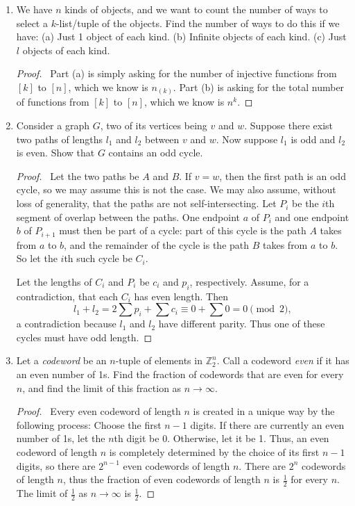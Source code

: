 \documentclass[12pt]{article}
\begin{document}
\begin{enumerate}[leftmargin=0cm,itemindent=.5cm,labelwidth=\itemindent,labelsep=0cm,align=left]
\item We have $n$ kinds of objects, and we want to count the number of ways to select a $k$-list/tuple of the objects.  Find the number of ways to do this if we have:
(a) Just 1 object of each kind.
(b) Infinite objects of each kind.
(c) Just $l$ objects of each kind.

\begin{proof}
\ Part (a) is simply asking for the number of injective functions from $[k]$ to $[n]$, which we know is $n_{(k)}$.  Part (b) is asking for the total number of functions from $[k]$ to $[n]$, which we know is $n^k$.
\end{proof}

\item Consider a graph $G$, two of its vertices being $v$ and $w$.  Suppose there exist two paths of lengths $l_1$ and $l_2$ between $v$ and $w$.  Now suppose $l_1$ is odd and $l_2$ is even.  Show that $G$ contains an odd cycle.

\begin{proof}
\ Let the two paths be $A$ and $B$.  If $v = w$, then the first path is an odd cycle, so we may assume this is not the case.  We may also assume, without loss of generality, that the paths are not self-intersecting.  Let $P_i$ be the $i$th segment of overlap between the paths.  One endpoint $a$ of $P_i$ and one endpoint $b$ of $P_{i+1}$ must then be part of a cycle: part of this cycle is the path $A$ takes from $a$ to $b$, and the remainder of the cycle is the path $B$ takes from $a$ to $b$.  So let the $i$th such cycle be $C_i$.

Let the lengths of $C_i$ and $P_i$ be $c_i$ and $p_i$, respectively.  Assume, for a contradiction, that each $C_i$ has even length.  Then
$$
l_1 + l_2 = 2\sum p_i + \sum c_i \equiv 0 + \sum 0 = 0 \pmod{2},
$$
a contradiction because $l_1$ and $l_2$ have different parity.  Thus one of these cycles must have odd length.
\end{proof}

\item Let a \emph{codeword} be an $n$-tuple of elements in $\mathbb{Z}_2^n$.  Call a codeword \emph{even} if it has an even number of 1s.  Find the fraction of codewords that are even for every $n$, and find the limit of this fraction as $n \rightarrow \infty$.

\begin{proof}
\ Every even codeword of length $n$ is created in a unique way by the following process:  Choose the first $n-1$ digits.  If there are currently an even number of 1s, let the $n$th digit be 0.  Otherwise, let it be 1.  Thus, an even codeword of length $n$ is completely determined by the choice of its first $n-1$ digits, so there are $2^{n-1}$ even codewords of length $n$.  There are $2^n$ codewords of length $n$, thus the fraction of even codewords of length $n$ is $\frac{1}{2}$ for every $n$.  The limit of $\frac12$ as $n \rightarrow \infty$ is $\frac12$.
\end{proof}


\end{enumerate}
\end{document}

